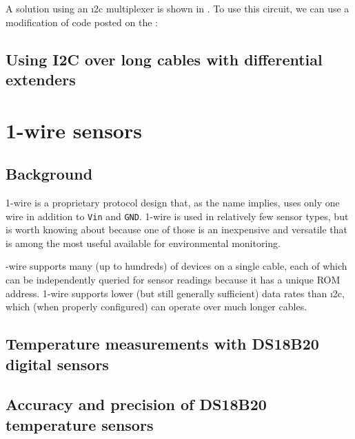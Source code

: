 A solution using an \i2c multiplexer is shown in .
To use this circuit, we can use a modification of code posted on the :



\subsection{\color{gray} Using I2C over long cables with differential extenders \color{black}}


\section{\color{gray}1-wire sensors \color{black}}
\subsection{\color{gray} Background \color{black}}
1-wire is a proprietary protocol design that, as the name implies, uses only one wire in addition to \texttt{Vin} and \texttt{GND}.
1-wire is used in relatively few sensor types, but is worth knowing about because one of those is an inexpensive and versatile  that is among the most useful available for environmental monitoring.

-wire supports many (up to hundreds) of devices on a single cable, each of which can be independently queried for sensor readings because it has a unique ROM address.
1-wire supports lower (but still generally sufficient) data rates than \i2c, which (when properly configured) can operate over much longer cables.

\subsection{\color{gray} Temperature measurements with DS18B20 digital sensors \color{black}}
\subsection{\color{gray} Accuracy and precision of DS18B20 temperature sensors \color{black}}
